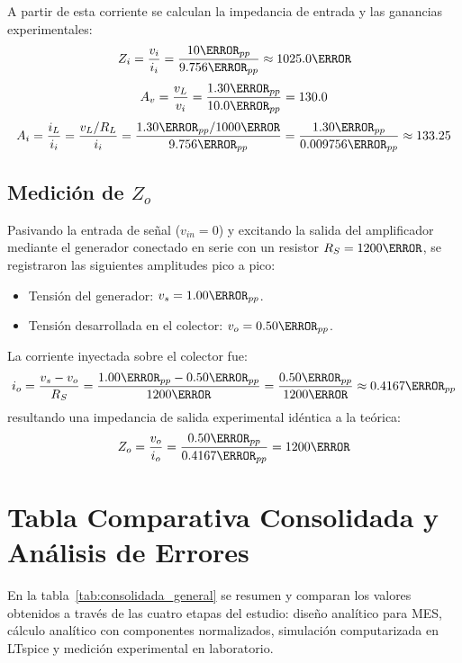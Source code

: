 A partir de esta corriente se calculan la impedancia de entrada y las ganancias experimentales:
\begin{equation}
  Z_i = \frac{v_i}{i_i} = \frac{10\mV_{pp}}{9.756\uA_{pp}} \approx 1025.0\ohm
\end{equation}
\begin{equation}
  A_v = \frac{v_L}{v_i} = \frac{1.30\V_{pp}}{10.0\mV_{pp}} = 130.0
\end{equation}
\begin{equation}
  A_i = \frac{i_L}{i_i} = \frac{v_L / R_L}{i_i} = \frac{1.30\V_{pp} / 1000\ohm}{9.756\uA_{pp}} = \frac{1.30\mA_{pp}}{0.009756\mA_{pp}} \approx 133.25
\end{equation}

\subsection{Medición de \texorpdfstring{$Z_o$}{Zo}}
Pasivando la entrada de señal ($v_{in} = 0$) y excitando la salida del amplificador mediante el generador conectado en
serie con un resistor $R_S = 1200\ohm$, se registraron las siguientes amplitudes pico a pico:
\begin{itemize}
  \item Tensión del generador: $v_s = 1.00\V_{pp}$.
  \item Tensión desarrollada en el colector: $v_o = 0.50\V_{pp}$.
\end{itemize}

La corriente inyectada sobre el colector fue:
\begin{equation}
  i_o = \frac{v_s - v_o}{R_S} = \frac{1.00\V_{pp} - 0.50\V_{pp}}{1200\ohm} = \frac{0.50\V_{pp}}{1200\ohm} \approx 0.4167\mA_{pp}
\end{equation}
resultando una impedancia de salida experimental idéntica a la teórica:
\begin{equation}
  Z_o = \frac{v_o}{i_o} = \frac{0.50\V_{pp}}{0.4167\mA_{pp}} = 1200\ohm
\end{equation}

\section{Tabla Comparativa Consolidada y Análisis de Errores}

En la tabla~\ref{tab:consolidada_general} se resumen y comparan los valores obtenidos a través de las cuatro etapas del
estudio: diseño analítico para MES, cálculo analítico con componentes normalizados, simulación computarizada en LTspice
y medición experimental en laboratorio.

